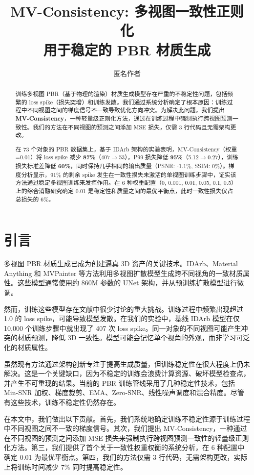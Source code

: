 \documentclass{article}
\title{MV-Consistency: 多视图一致性正则化\\用于稳定的 PBR 材质生成}
\author{匿名作者}
\begin{document}
\maketitle

\begin{abstract}
训练多视图 PBR（基于物理的渲染）材质生成模型存在严重的不稳定性问题，包括频繁的 loss spike（损失突增）和训练发散。我们通过系统分析确定了根本原因：训练过程中不同视图之间的梯度信号不一致导致优化方向冲突。为解决此问题，我们提出 \textbf{MV-Consistency}，一种轻量级正则化方法，通过在训练过程中强制执行跨视图预测一致性。我们的方法在不同视图的预测之间添加 MSE 损失，仅需 3 行代码且无需架构更改。

在 73 个对象的 PBR 数据集上，基于 IDArb 架构的实验表明，MV-Consistency（权重=0.01）将 loss spike 减少 \textbf{87\%}（407$\to$53），P99 损失降低 \textbf{95\%}（5.12$\to$0.27），训练损失标准差降低 \textbf{60\%}，同时保持几乎相同的输出质量（PSNR: -1.1\%, SSIM: 0\%）。梯度分析显示，91\% 的剩余 spike 发生在一致性损失未激活的单视图训练步骤中，证实该方法通过稳定多视图训练来发挥作用。在 6 种权重配置（0, 0.001, 0.01, 0.05, 0.1, 0.5）上的综合消融研究确定 0.01 是稳定性和质量之间的最优平衡点，此时一致性损失仅占总损失的 6\%。
\end{abstract}

\section{引言}

多视图 PBR 材质生成已成为创建逼真 3D 资产的关键技术。IDArb、Material Anything 和 MVPainter 等方法利用多视图扩散模型生成跨不同视角的一致材质属性。这些模型通常使用约 860M 参数的 UNet 架构，并从预训练扩散模型进行微调。

然而，训练这些模型存在文献中很少讨论的重大挑战。训练过程中频繁出现超过 1.0 的 loss spike，可能导致模型发散。在我们的实验中，基线 IDArb 模型在仅 10,000 个训练步骤中就出现了 407 次 loss spike。同一对象的不同视图可能产生冲突的材质预测，降低 3D 一致性。模型可能会记忆单个视角的外观，而非学习可泛化的材质属性。

虽然现有方法通过架构创新专注于提高生成质量，但训练稳定性在很大程度上仍未解决。这是一个关键缺口，因为不稳定的训练会浪费计算资源、破坏模型检查点，并产生不可重现的结果。当前的 PBR 训练管线采用了几种稳定性技术，包括 Min-SNR 加权、梯度裁剪、EMA、Zero-SNR、线性噪声调度和混合精度。尽管有这些技术，训练不稳定性仍然存在。

在本文中，我们做出以下贡献。首先，我们系统地确定训练不稳定性源于训练过程中不同视图之间不一致的梯度信号。其次，我们提出 MV-Consistency，一种通过在不同视图的预测之间添加 MSE 损失来强制执行跨视图预测一致性的轻量级正则化方法。第三，我们提供了首个关于一致性权重权衡的系统分析，在 6 种配置中确定 0.01 为最优平衡点。第四，我们的方法仅需 3 行代码，无需架构更改，实际上将训练时间减少 7\% 同时提高稳定性。
\end{document}
